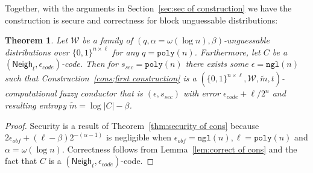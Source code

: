 \documentclass[11pt]{article}
\newcommand{\secref}[1]{\mbox{Section~\ref{#1}}}
\newcommand{\thref}[1]{\mbox{Theorem~\ref{#1}}}
\newcommand{\lemref}[1]{\mbox{Lemma~\ref{#1}}}
\newcommand{\consref}[1]{\mbox{Construction~\ref{#1}}}
\DeclareMathOperator*{\expe}{\mathbb{E}}
\newcommand{\class}[1]{{\ensuremath{\mathsf{#1}}}}
\newcommand{\zo}{\ensuremath{\{0, 1\}}}
\newcommand{\neigh}{\ensuremath{\class{Neigh}}\xspace}
\newcommand{\dis}{\ensuremath{\mathsf{dis}}}
\newcommand{\poly}{\ensuremath{\mathtt{poly}}\xspace}
\newcommand{\ngl}{\ensuremath{\mathtt{ngl}}\xspace}
\newtheorem{theorem}{Theorem}[section]
\newtheorem{lemma}[theorem]{Lemma}
\newcommand{\authnote}[2]{{\textcolor{red}{\textsf{#1 notes: }\textcolor{blue}{ #2}}\marginpar{\textcolor{red}{\textbf{!!!!!}}}}}
\newcommand{\authnote}[2]{}
\newcommand{\bnote}[1]{{\authnote{Ben}{#1}}}
\begin{document}

Together, with the arguments in \secref{sec:sec of construction} we have the construction is secure and correctness for block unguessable distributions:
\begin{theorem}
Let $\mathcal{W}$ be a family of $(q,\alpha= \omega(\log n),  \beta)$-unguessable distributions over $\zo^{n\times \ell}$ for any $q = \poly(n)$.  Furthermore, let $C$ be a $(\neigh_t, \epsilon_{code})$-code.  Then for $s_{sec} = \poly(n)$ there exists some $\epsilon=\ngl(n)$ such that \consref{cons:first construction} is a $(\zo^{n\times \ell}, \mathcal{W}, \tilde{m}, t)$-computational fuzzy conductor that is $(\epsilon, s_{sec})$ with error $\epsilon_{code} + \ell/2^n$ and resulting entropy $\tilde{m} =\log |C| - \beta$.
\end{theorem}
\begin{proof}
Security is a result of \thref{thm:security of cons} because $2\epsilon_{obf} + (\ell-\beta)2^{-(\alpha-1)}$ is negligible when $\epsilon_{obf} = \ngl(n), \ell = \poly(n)$ and $\alpha =\omega(\log n)$.  Correctness follows from \lemref{lem:correct of cons} and the fact that $C$ is a $(\neigh_t, \epsilon_{code})$-code.
\end{proof}
\end{document}
